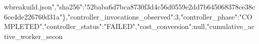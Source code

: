 \documentclass[10pt]{article}
\begin{document}
wbreak{}u\allowbreak{}i\allowbreak{}l\allowbreak{}d\allowbreak{}.\allowbreak{}j\allowbreak{}s\allowbreak{}o\allowbreak{}n\allowbreak{}"\allowbreak{},\allowbreak{}"\allowbreak{}s\allowbreak{}h\allowbreak{}a\allowbreak{}2\allowbreak{}5\allowbreak{}6\allowbreak{}"\allowbreak{}:\allowbreak{}"\allowbreak{}5\allowbreak{}2\allowbreak{}b\allowbreak{}a\allowbreak{}b\allowbreak{}a\allowbreak{}6\allowbreak{}d\allowbreak{}7\allowbreak{}b\allowbreak{}c\allowbreak{}a\allowbreak{}8\allowbreak{}7\allowbreak{}3\allowbreak{}0\allowbreak{}f\allowbreak{}3\allowbreak{}d\allowbreak{}4\allowbreak{}c\allowbreak{}5\allowbreak{}6\allowbreak{}d\allowbreak{}0\allowbreak{}5\allowbreak{}5\allowbreak{}9\allowbreak{}e\allowbreak{}2\allowbreak{}d\allowbreak{}d\allowbreak{}7\allowbreak{}b\allowbreak{}6\allowbreak{}4\allowbreak{}5\allowbreak{}0\allowbreak{}6\allowbreak{}8\allowbreak{}3\allowbreak{}7\allowbreak{}8\allowbreak{}c\allowbreak{}e\allowbreak{}3\allowbreak{}8\allowbreak{}c\allowbreak{}6\allowbreak{}c\allowbreak{}e\allowbreak{}4\allowbreak{}d\allowbreak{}e\allowbreak{}2\allowbreak{}2\allowbreak{}6\allowbreak{}7\allowbreak{}6\allowbreak{}0\allowbreak{}d\allowbreak{}3\allowbreak{}1\allowbreak{}a\allowbreak{}"\allowbreak{}\}\allowbreak{},\allowbreak{}"\allowbreak{}c\allowbreak{}o\allowbreak{}n\allowbreak{}t\allowbreak{}r\allowbreak{}o\allowbreak{}l\allowbreak{}l\allowbreak{}e\allowbreak{}r\allowbreak{}\_\allowbreak{}i\allowbreak{}n\allowbreak{}v\allowbreak{}o\allowbreak{}c\allowbreak{}a\allowbreak{}t\allowbreak{}i\allowbreak{}o\allowbreak{}n\allowbreak{}s\allowbreak{}\_\allowbreak{}o\allowbreak{}b\allowbreak{}s\allowbreak{}e\allowbreak{}r\allowbreak{}v\allowbreak{}e\allowbreak{}d\allowbreak{}"\allowbreak{}:\allowbreak{}3\allowbreak{},\allowbreak{}"\allowbreak{}c\allowbreak{}o\allowbreak{}n\allowbreak{}t\allowbreak{}r\allowbreak{}o\allowbreak{}l\allowbreak{}l\allowbreak{}e\allowbreak{}r\allowbreak{}\_\allowbreak{}p\allowbreak{}h\allowbreak{}a\allowbreak{}s\allowbreak{}e\allowbreak{}"\allowbreak{}:\allowbreak{}"\allowbreak{}C\allowbreak{}O\allowbreak{}M\allowbreak{}P\allowbreak{}L\allowbreak{}E\allowbreak{}T\allowbreak{}E\allowbreak{}D\allowbreak{}"\allowbreak{},\allowbreak{}"\allowbreak{}c\allowbreak{}o\allowbreak{}n\allowbreak{}t\allowbreak{}r\allowbreak{}o\allowbreak{}l\allowbreak{}l\allowbreak{}e\allowbreak{}r\allowbreak{}\_\allowbreak{}s\allowbreak{}t\allowbreak{}a\allowbreak{}t\allowbreak{}u\allowbreak{}s\allowbreak{}"\allowbreak{}:\allowbreak{}"\allowbreak{}F\allowbreak{}A\allowbreak{}I\allowbreak{}L\allowbreak{}E\allowbreak{}D\allowbreak{}"\allowbreak{},\allowbreak{}"\allowbreak{}c\allowbreak{}o\allowbreak{}s\allowbreak{}t\allowbreak{}\_\allowbreak{}c\allowbreak{}o\allowbreak{}n\allowbreak{}v\allowbreak{}e\allowbreak{}r\allowbreak{}s\allowbreak{}i\allowbreak{}o\allowbreak{}n\allowbreak{}"\allowbreak{}:\allowbreak{}n\allowbreak{}u\allowbreak{}l\allowbreak{}l\allowbreak{},\allowbreak{}"\allowbreak{}c\allowbreak{}u\allowbreak{}m\allowbreak{}u\allowbreak{}l\allowbreak{}a\allowbreak{}t\allowbreak{}i\allowbreak{}v\allowbreak{}e\allowbreak{}\_\allowbreak{}a\allowbreak{}c\allowbreak{}t\allowbreak{}i\allowbreak{}v\allowbreak{}e\allowbreak{}\_\allowbreak{}w\allowbreak{}o\allowbreak{}r\allowbreak{}k\allowbreak{}e\allowbreak{}r\allowbreak{}\_\allowbreak{}s\allowbreak{}e\allowbreak{}c\allowbreak{}o\allowbreak{}n
\end{document}
